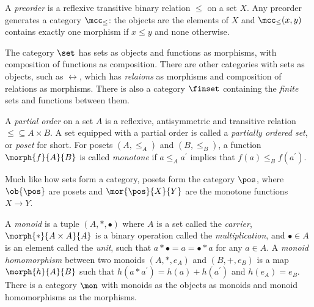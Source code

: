 \begin{example}[Preorder]
    A \emph{preorder} is a reflexive transitive binary relation \(\leq\) on a
    set \(X\).
    Any preorder generates a category \(\mcc_\leq\): the objects are the
    elements of \(X\) and \(\mcc_\leq(x, y)\) contains exactly one morphism if
    \(x \leq y\) and none otherwise.
\end{example}

\begin{example}[Sets]
    The category \(\set\) has sets as objects and functions as morphisms, with
    composition of functions as composition.
    There are other categories with sets as objects, such as \(\rel\), which has
    \emph{relaions} as morphisms and composition of relations as morphisms.
    There is also a category \(\finset\) containing the \emph{finite} sets
    and functions between them.
\end{example}

\begin{example}[Posets]
    A \emph{partial order} on a set \(A\) is a reflexive, antisymmetric and
    transitive relation \({\leq} \subseteq A \times B\).
    A set equipped with a partial order is called a
    \emph{partially ordered set}, or \emph{poset} for short.
    For posets \((A,{\leq_A})\) and \((B,{\leq_B})\), a function
    \(\morph{f}{A}{B}\) is called \emph{monotone} if \(a \leq_A a^\prime\)
    implies that \(f(a) \leq_B f(a^\prime)\).

    Much like how sets form a category, posets form the category \(\pos\), where
    \(\ob{\pos}\) are posets and \(\mor{\pos}{X}{Y}\) are the monotone functions
    \(X \to Y\).
\end{example}

\begin{example}[Monoids]
    A \emph{monoid} is a tuple \((A, *, \bullet)\) where \(A\) is a set called
    the \emph{carrier}, \(\morph{*}{A \times A}{A}\) is a binary operation
    called the \emph{multiplication}, and \(\bullet \in A\) is an element called
    the \emph{unit}, such that \(a * \bullet = a = \bullet * a\) for any
    \(a \in A\).
    A \emph{monoid homomorphism} between two monoids \((A, *, e_A)\) and
    \((B, +, e_B)\) is a map \(\morph{h}{A}{B}\) such that
    \(h(a * a^\prime) = h(a) + h(a^\prime)\) and \(h(e_A) = e_B\).
    There is a category \(\mon\) with monoids as the objects as monoids and
    monoid homomorphisms as the morphisms.
\end{example}

